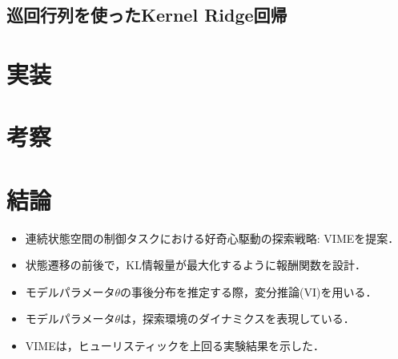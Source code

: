 \documentclass[11pt,a4j]{jarticle}
\begin{document}
    \subsection{巡回行列を使ったKernel Ridge回帰}
    

  \section{実装}
  \section{考察}
  \section{結論}
    \begin{itemize}
      \item 連続状態空間の制御タスクにおける好奇心駆動の探索戦略: VIMEを提案．
      \item 状態遷移の前後で，KL情報量が最大化するように報酬関数を設計．
      \item モデルパラメータ$\theta$の事後分布を推定する際，変分推論(VI)を用いる．
      \item モデルパラメータ$\theta$は，探索環境のダイナミクスを表現している．
      \item VIMEは，ヒューリスティックを上回る実験結果を示した．
    \end{itemize}

\end{document}
